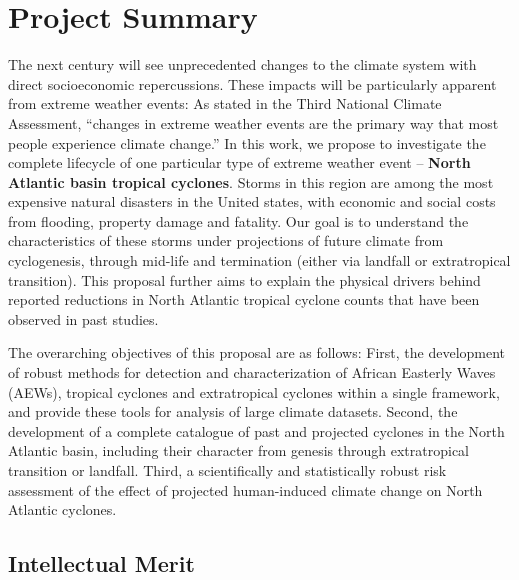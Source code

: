 \documentclass[11pt]{article}
\begin{document}
\appendix

\addtocounter{section}{1}

\section{Project Summary}
\vspace{-0.2cm}

The next century will see unprecedented changes to the climate system with direct socioeconomic repercussions.  These impacts will be particularly apparent from extreme weather events: As stated in the Third National Climate Assessment, ``changes in extreme weather events are the primary way that most people experience climate change.''  In this work, we propose to investigate the complete lifecycle of one particular type of extreme weather event -- \textbf{North Atlantic basin tropical cyclones}.  Storms in this region are among the most expensive natural disasters in the United states, with economic and social costs from flooding, property damage and fatality.  Our goal is to understand the characteristics of these storms under projections of future climate from cyclogenesis, through mid-life and termination (either via landfall or extratropical transition).  This proposal further aims to explain the physical drivers behind reported reductions in North Atlantic tropical cyclone counts that have been observed in past studies.

The overarching objectives of this proposal are as follows:  First, the development of robust methods for detection and characterization of African Easterly Waves (AEWs), tropical cyclones and extratropical cyclones within a single framework, and provide these tools for analysis of large climate datasets.  Second, the development of a complete catalogue of past and projected cyclones in the North Atlantic basin, including their character from genesis through extratropical transition or landfall.  Third, a scientifically and statistically robust risk assessment of the effect of projected human-induced climate change on North Atlantic cyclones.

\vspace{-0.7cm}
\subsection*{Intellectual Merit}
\vspace{-0.6cm}
\end{document}
